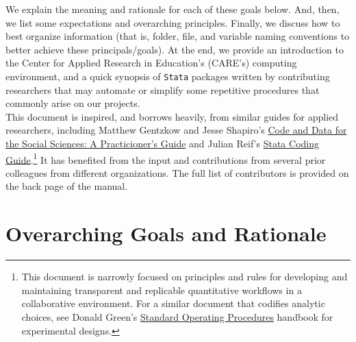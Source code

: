 We explain the meaning and rationale for each of these goals below. And, then, we list some expectations and overarching principles. Finally, we discuss how to best organize information (that is, folder, file, and variable naming conventions to better achieve these principals/goals). At the end, we provide an introduction to the Center for Applied Research in Education's (CARE's) computing environment, and a quick synopsis of \texttt{Stata} packages written by contributing researchers that may automate or simplify some repetitive procedures that commonly arise on our projects.\\

This document is inspired, and borrows heavily, from similar guides for applied researchers, including Matthew Gentzkow and Jesse Shapiro's \href{https://www.brown.edu/Research/Shapiro/pdfs/CodeAndData.pdf}{Code and Data for the Social Sciences: A Practicioner's Guide} and Julian Reif's \href{https://julianreif.com/guide/}{Stata Coding Guide}.\footnote{This document is narrowly focused on principles and rules for developing and maintaining transparent and replicable quantitative workflows in a collaborative environment. For a similar document that codifies analytic choices, see Donald Green's \href{https://alexandercoppock.com/Green-Lab-SOP/Green_Lab_SOP.html}{Standard Operating Procedures} handbook for experimental designs.} It has benefited from the input and contributions from several prior colleagues from different organizations. The full list of contributors is provided on the back page of the manual.

\section{Overarching Goals and Rationale} \label{sec:rationale}

